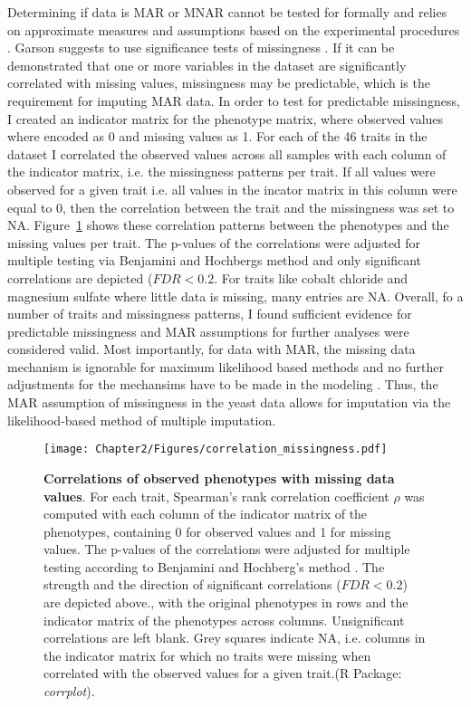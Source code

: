 Determining if data is MAR or MNAR cannot be tested for formally and relies on approximate measures and assumptions based on the experimental procedures \citep{SchaferGraham2002,Garson2015,Templ2012}. Garson suggests to use significance tests of missingness \citeyear{Garson2015}. If it can be demonstrated that one or more variables in the dataset are significantly correlated with missing values, missingness may be predictable, which is the requirement for imputing MAR data. In order to test for predictable missingness, I created an indicator matrix for the phenotype matrix, where observed values where encoded as 0 and missing values as 1. For each of the 46 traits in the dataset I correlated the observed values across all samples with each column of the indicator matrix, i.e. the missingness patterns per trait. If all values were observed for a given trait i.e. all values in the incator matrix in this column were equal to 0, then the correlation between the trait and the missingness was set to NA. Figure~\ref{fig:missingnesscorrelations} shows these correlation patterns between the phenotypes and the missing values per trait. The p-values of the correlations were adjusted for multiple testing via Benjamini and Hochbergs method \citep{Benjamini1995} and only significant correlations are depicted (\(FDR < 0.2\).  For traits like cobalt chloride and magnesium sulfate where little data is missing, many entries are NA. Overall, fo a number of traits and missingness patterns, I found sufficient evidence for predictable missingness and MAR assumptions for further analyses were considered valid. Most importantly, for data with MAR, the missing data mechanism is ignorable for maximum likelihood based methods and no further adjustments for the mechansims have to be made in the modeling \citep{Rubin1976,Little1988}. Thus, the MAR assumption of missingness in the yeast data allows for imputation via the likelihood-based method of multiple imputation.


\begin{figure}[hbtp]
	\centering
	\texttt{[image: Chapter2/Figures/correlation\_missingness.pdf]}
	\caption[Correlations of observed phenotypes with missing data values]{\textbf{Correlations of observed phenotypes with missing data values}. For each trait, Spearman's rank correlation coefficient \(\rho\) was computed with each column of the indicator matrix of the phenotypes, containing 0 for observed values and 1 for missing values. The p-values of the correlations were adjusted for multiple testing according to Benjamini and Hochberg's method \citep{Benjamini1995}. The strength and the direction of significant correlations (\(FDR < 0.2\)) are depicted above., with the original phenotypes in rows and the indicator matrix of the phenotypes across columns. Unsignificant correlations are left blank. Grey squares indicate NA, i.e. columns in the indicator matrix for which no traits were missing when correlated with the observed values for a given trait.(R Package: \emph{corrplot}).}
 	\label{fig:missingnesscorrelations}
\end{figure}

